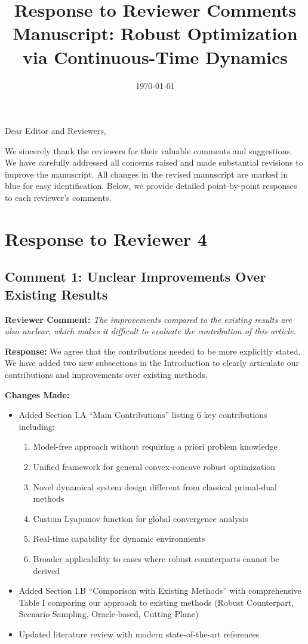 \documentclass[11pt]{article}
\title{\Large Response to Reviewer Comments\\
\vspace{0.5em}
\large Manuscript: Robust Optimization via Continuous-Time Dynamics}
\author{}
\date{\today}
\newcommand{\reviewercomment}[1]{\textbf{Reviewer Comment:} \textit{#1}}
\newcommand{\response}[1]{\textbf{Response:} #1}
\newcommand{\changes}[1]{\textbf{Changes Made:} #1}
\begin{document}
\maketitle

\noindent Dear Editor and Reviewers,

We sincerely thank the reviewers for their valuable comments and suggestions. We have carefully addressed all concerns raised and made substantial revisions to improve the manuscript. All changes in the revised manuscript are marked in {\color{blue}blue} for easy identification. Below, we provide detailed point-by-point responses to each reviewer's comments.

\section*{Response to Reviewer 4}

\subsection*{Comment 1: Unclear Improvements Over Existing Results}

\reviewercomment{The improvements compared to the existing results are also unclear, which makes it difficult to evaluate the contribution of this article.}

\response{We agree that the contributions needed to be more explicitly stated. We have added two new subsections in the Introduction to clearly articulate our contributions and improvements over existing methods.}

\changes{
\begin{itemize}
\item Added Section I.A ``Main Contributions'' listing 6 key contributions including:
  \begin{enumerate}
  \item Model-free approach without requiring a priori problem knowledge
  \item Unified framework for general convex-concave robust optimization
  \item Novel dynamical system design different from classical primal-dual methods
  \item Custom Lyapunov function for global convergence analysis
  \item Real-time capability for dynamic environments
  \item Broader applicability to cases where robust counterparts cannot be derived
  \end{enumerate}
\item Added Section I.B ``Comparison with Existing Methods'' with comprehensive Table I comparing our approach to existing methods (Robust Counterpart, Scenario Sampling, Oracle-based, Cutting Plane)
\item Updated literature review with modern state-of-the-art references
\end{itemize}
}
\end{document}

